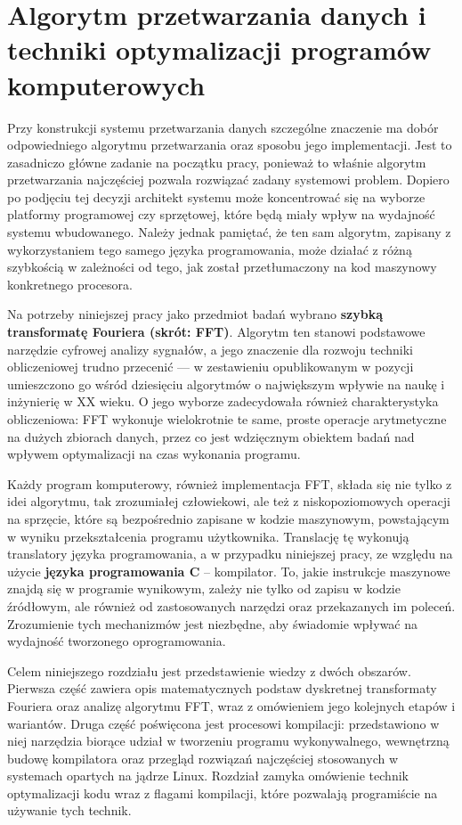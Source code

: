 \chapter{Algorytm przetwarzania danych i techniki optymalizacji programów komputerowych}
Przy konstrukcji systemu przetwarzania danych szczególne znaczenie ma dobór odpowiedniego algorytmu przetwarzania oraz sposobu jego implementacji. Jest to zasadniczo główne zadanie na początku pracy, ponieważ to właśnie algorytm przetwarzania najczęściej pozwala rozwiązać zadany systemowi problem. Dopiero po podjęciu tej decyzji architekt systemu może koncentrować się na wyborze platformy programowej czy sprzętowej, które będą miały wpływ na wydajność systemu wbudowanego. Należy jednak pamiętać, że ten sam algorytm, zapisany z wykorzystaniem tego samego języka programowania, może działać z różną szybkością w zależności od tego, jak został przetłumaczony na kod maszynowy konkretnego procesora.

Na potrzeby niniejszej pracy jako przedmiot badań wybrano \textbf{szybką transformatę Fouriera (skrót: FFT)}. Algorytm ten stanowi podstawowe narzędzie cyfrowej analizy sygnałów, a jego znaczenie dla rozwoju techniki obliczeniowej trudno przecenić — w zestawieniu opublikowanym w pozycji ~\cite{DongarraTopTen} umieszczono go wśród dziesięciu algorytmów o największym wpływie na naukę i inżynierię w XX wieku. O jego wyborze zadecydowała również charakterystyka obliczeniowa: FFT wykonuje wielokrotnie te same, proste operacje arytmetyczne na dużych zbiorach danych, przez co jest wdzięcznym obiektem badań nad wpływem optymalizacji na czas wykonania programu.

Każdy program komputerowy, również implementacja FFT, składa się nie tylko z idei algorytmu, tak zrozumiałej człowiekowi, ale też z niskopoziomowych operacji na sprzęcie, które są bezpośrednio zapisane w kodzie maszynowym, powstającym w wyniku przekształcenia programu użytkownika. Translację tę wykonują translatory języka programowania, a w przypadku niniejszej pracy, ze względu na użycie \textbf{języka programowania C} – kompilator. To, jakie instrukcje maszynowe znajdą się w programie wynikowym, zależy nie tylko od zapisu w kodzie źródłowym, ale również od zastosowanych narzędzi oraz przekazanych im poleceń. Zrozumienie tych mechanizmów jest niezbędne, aby świadomie wpływać na wydajność tworzonego oprogramowania.

Celem niniejszego rozdziału jest przedstawienie wiedzy z dwóch obszarów. Pierwsza część zawiera opis matematycznych podstaw dyskretnej transformaty Fouriera oraz analizę algorytmu FFT, wraz z omówieniem jego kolejnych etapów i wariantów. Druga część poświęcona jest procesowi kompilacji: przedstawiono w niej narzędzia biorące udział w tworzeniu programu wykonywalnego, wewnętrzną budowę kompilatora oraz przegląd rozwiązań najczęściej stosowanych w systemach opartych na jądrze Linux. Rozdział zamyka omówienie technik optymalizacji kodu wraz z flagami kompilacji, które pozwalają programiście na używanie tych technik.
